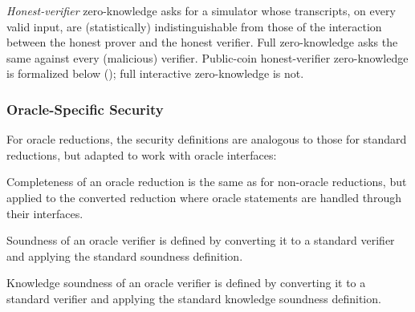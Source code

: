 \begin{remark}
    \emph{Honest-verifier} zero-knowledge asks for a simulator whose transcripts, on every valid
    input, are (statistically) indistinguishable from those of the interaction between the honest
    prover and the honest verifier. Full zero-knowledge asks the same against every (malicious)
    verifier. Public-coin honest-verifier zero-knowledge is formalized below (); full interactive zero-knowledge is not.
\end{remark}



\subsubsection{Oracle-Specific Security}

For oracle reductions, the security definitions are analogous to those for standard reductions, but adapted to work with oracle interfaces:

\begin{definition}
    \label{def:oracle_reduction_completeness}
    Completeness of an oracle reduction is the same as for non-oracle reductions, but applied to the
    converted reduction where oracle statements are handled through their interfaces.
    \leanok
\end{definition}

\begin{definition}
    \label{def:oracle_verifier_soundness}
    Soundness of an oracle verifier is defined by converting it to a standard verifier and applying
    the standard soundness definition.
    \leanok
\end{definition}

\begin{definition}
    \label{def:oracle_verifier_knowledge_soundness}
    Knowledge soundness of an oracle verifier is defined by converting it to a standard verifier
    and applying the standard knowledge soundness definition.
    \leanok
\end{definition}


